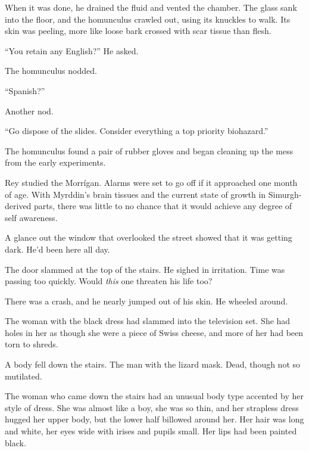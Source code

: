 When it was done, he drained the fluid and vented the chamber.  The glass sank into the floor, and the homunculus crawled out, using its knuckles to walk.  Its skin was peeling, more like loose bark crossed with scar tissue than flesh.  



``You retain any English?''  He asked.



The homunculus nodded.



``Spanish?''



Another nod.



``Go dispose of the slides.  Consider everything a top priority biohazard.''



The homunculus found a pair of rubber gloves and began cleaning up the mess from the early experiments.



Rey studied the Morr\'{i}gan.  Alarms were set to go off if it approached one month of age.  With Myrddin's brain tissues and the current state of growth in Simurgh-derived parts, there was little to no chance that it would achieve any degree of self awareness.



A glance out the window that overlooked the street showed that it was getting dark.  He'd been here all day.



The door slammed at the top of the stairs.  He sighed in irritation.  Time was passing too quickly.  Would \emph{this} one threaten his life too?



There was a crash, and he nearly jumped out of his skin.  He wheeled around.



The woman with the black dress had slammed into the television set.  She had holes in her as though she were a piece of Swiss cheese, and more of her had been torn to shreds.



A body fell down the stairs.  The man with the lizard mask.  Dead, though not so mutilated.



The woman who came down the stairs had an unusual body type accented by her style of dress.  She was almost like a boy, she was so thin, and her strapless dress hugged her upper body, but the lower half billowed around her.  Her hair was long and white, her eyes wide with irises and pupils small.  Her lips had been painted black.



